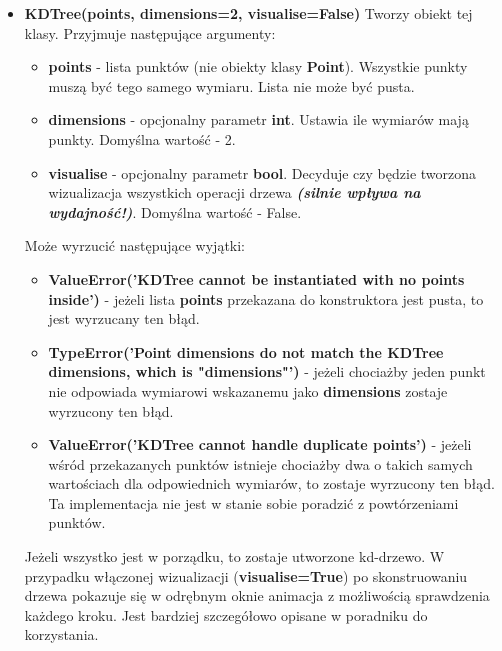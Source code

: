 \documentclass[a4paper, 12pt]{article}
\begin{document}
    \begin{itemize}
        \item \textbf{KDTree(points, dimensions=2, visualise=False)} \vspace{6pt}\newline
        \quad Tworzy obiekt tej klasy. Przyjmuje następujące argumenty:
        \begin{itemize}
            \item \textbf{points} - lista punktów (nie obiekty klasy \textbf{Point}). Wszystkie punkty muszą być tego samego wymiaru. Lista nie może być pusta.
            \item \textbf{dimensions} - opcjonalny parametr \textbf{int}. Ustawia ile wymiarów mają punkty. Domyślna wartość - 2.
            \item \textbf{visualise} - opcjonalny parametr \textbf{bool}. Decyduje czy będzie tworzona wizualizacja wszystkich operacji drzewa \textbf{\textit{(silnie wpływa na wydajność!)}}. Domyślna wartość - False.
        \end{itemize}
        
        \noindent
        \quad Może wyrzucić następujące wyjątki:
        \begin{itemize}
            \item \textbf{ValueError('KDTree cannot be instantiated with no points inside')} - jeżeli lista \textbf{points} przekazana do konstruktora jest pusta, to jest wyrzucany ten błąd.
            \item \textbf{TypeError('Point dimensions do not match the KDTree dimensions, which is "dimensions"')} - jeżeli chociażby jeden punkt nie odpowiada wymiarowi wskazanemu jako \textbf{dimensions} zostaje wyrzucony ten błąd.
            \item \textbf{ValueError('KDTree cannot handle duplicate points')} - jeżeli wśród przekazanych punktów istnieje chociażby dwa o takich samych wartościach dla odpowiednich wymiarów, to zostaje wyrzucony ten błąd. Ta implementacja nie jest w stanie sobie poradzić z powtórzeniami punktów.
        \end{itemize}
        
        \noindent
        \quad Jeżeli wszystko jest w porządku, to zostaje utworzone kd-drzewo. W przypadku włączonej wizualizacji (\textbf{visualise=True}) po skonstruowaniu drzewa pokazuje się w odrębnym oknie animacja z możliwością sprawdzenia każdego kroku. Jest bardziej szczegółowo opisane w poradniku do korzystania.
        \vspace{6pt}
        

\end{itemize}
\end{document}
